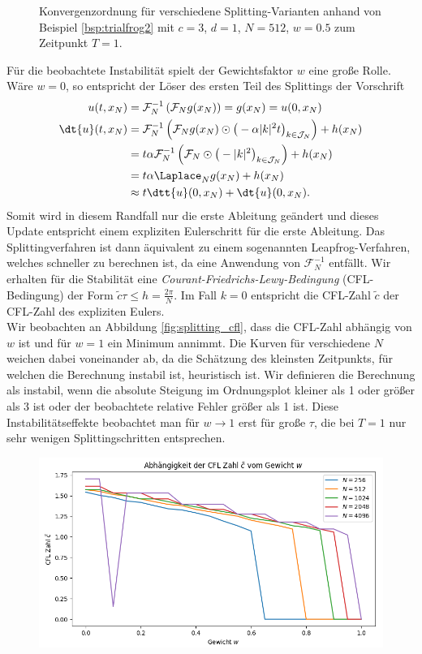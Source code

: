 \begin{mathbsp}
\begin{figure}[!htb]
\caption{Konvergenzordnung für verschiedene Splitting-Varianten anhand von Beispiel \ref{bsp:trialfrog2} mit $c=3$, $d=1$, $N=512$, $w=0.5$ zum Zeitpunkt $T=1$.}
\label{fig:splitting_convergence}
\end{figure}
Für die beobachtete Instabilität spielt der Gewichtsfaktor $w$ eine große Rolle. Wäre $w=0$, so entspricht der Löser des ersten Teil des Splittings der Vorschrift
\begin{align*}
u(t,x_N)&=\mathcal{F}_N^{-1}\left(\mathcal{F}_Ng(x_N)\right)=g(x_N)=u(0,x_N)\\
\dt{u}(t,x_N)&=\mathcal{F}_N^{-1}\left(\mathcal{F}_Ng(x_N)\odot \big(-\alpha |k|^2t\big)_{k\in\mathcal{J}_N}\right)+h(x_N)\\
&=t \alpha \mathcal{F}_N^{-1}\left(\mathcal{F}_N\odot \big(-|k|^2\big)_{k\in\mathcal{J}_N}\right)+h(x_N)\\
&=t\alpha \Laplace_N g(x_N)+h(x_N)\\
&\approx t\dtt{u}(0,x_N)+\dt{u}(0,x_N).
\end{align*}
Somit wird in diesem Randfall nur die erste Ableitung geändert und dieses Update entspricht einem expliziten Eulerschritt für die erste Ableitung. Das Splittingverfahren ist dann äquivalent zu einem sogenannten Leapfrog-Verfahren, welches schneller zu berechnen ist, da eine Anwendung von $\mathcal{F}_N^{-1}$ entfällt. Wir erhalten für die Stabilität eine \emph{Courant-Friedrichs-Lewy-Bedingung} (CFL-Bedingung) der Form $\tilde{c}\tau\le h=\frac{2\pi}{N}$. Im Fall $k=0$ entspricht die CFL-Zahl $\tilde{c}$ der CFL-Zahl des expliziten Eulers.\\[0.3cm]
Wir beobachten an Abbildung \ref{fig:splitting_cfl}, dass die CFL-Zahl abhängig von $w$ ist und für $w=1$ ein Minimum annimmt. Die Kurven für verschiedene $N$ weichen dabei voneinander ab, da die Schätzung des kleinsten Zeitpunkts, für welchen die Berechnung instabil ist, heuristisch ist. Wir definieren die Berechnung als instabil, wenn die absolute Steigung im Ordnungsplot kleiner als 1 oder größer als 3 ist oder der beobachtete relative Fehler größer als 1 ist. Diese Instabilitätseffekte beobachtet man für $w\to 1$ erst für große $\tau$, die bei $T=1$ nur sehr wenigen Splittingschritten entsprechen.
\begin{figure}[!htb]
\includegraphics[width=\textwidth]{Figures/cfl_estimations_frog2.png}

\end{figure}
\end{mathbsp}

